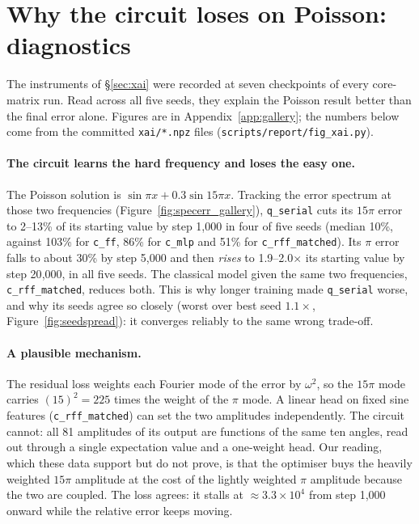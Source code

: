 \section{Why the circuit loses on Poisson: diagnostics}
\label{sec:diagnostics}

The instruments of \S\ref{sec:xai} were recorded at seven checkpoints of every
core-matrix run. Read across all five seeds, they explain the Poisson result better
than the final error alone. Figures are in Appendix~\ref{app:gallery}; the numbers below
come from the committed \texttt{xai/*.npz} files
(\texttt{scripts/report/fig\_xai.py}).

\paragraph{The circuit learns the hard frequency and loses the easy one.} The Poisson
solution is $\sin\pi x+0.3\sin15\pi x$. Tracking the error spectrum at those two
frequencies (Figure~\ref{fig:specerr_gallery}), \texttt{q\_serial} cuts its $15\pi$
error to 2--13\% of its starting value by step 1{,}000 in four of five seeds (median
10\%, against 103\% for \texttt{c\_ff}, 86\% for \texttt{c\_mlp} and 51\% for
\texttt{c\_rff\_matched}). Its $\pi$ error falls to about 30\% by step 5{,}000 and then \emph{rises} to
1.9--2.0$\times$ its starting value by step 20{,}000, in all five seeds. The classical
model given the same two frequencies, \texttt{c\_rff\_matched}, reduces both. This is
why longer training made \texttt{q\_serial} worse, and why its seeds agree so closely
(worst over best seed $1.1\times$, Figure~\ref{fig:seedspread}): it converges reliably
to the same wrong trade-off.

\paragraph{A plausible mechanism.} The residual loss weights each Fourier mode of the
error by $\omega^2$, so the $15\pi$ mode carries $(15)^2=225$ times the weight of the
$\pi$ mode. A linear head on fixed sine features (\texttt{c\_rff\_matched}) can set the
two amplitudes independently. The circuit cannot: all 81 amplitudes of its output are
functions of the same ten angles, read out through a single expectation value and a
one-weight head. Our reading, which these data support but do not prove, is that the optimiser
buys the heavily weighted $15\pi$ amplitude at the cost of the lightly weighted $\pi$
amplitude because the two are coupled. The loss agrees: it stalls at
$\approx3.3\times10^4$ from step 1{,}000 onward while the relative error keeps moving.

